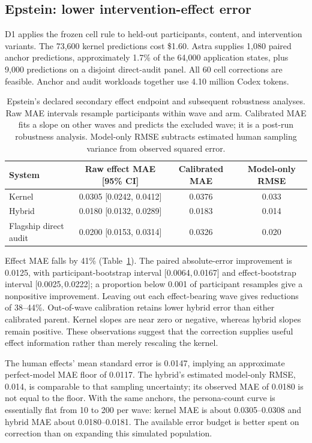 \documentclass[11pt]{article}
\newcommand{\CI}[2]{[#1,\,#2]}
\begin{document}
\subsection{Epstein: lower intervention-effect error}
D1 applies the frozen cell rule to held-out participants, content, and intervention variants. The 73,600 kernel predictions cost \$1.60. Astra supplies 1,080 paired anchor predictions, approximately 1.7\% of the 64,000 application states, plus 9,000 predictions on a disjoint direct-audit panel. All 60 cell corrections are feasible. Anchor and audit workloads together use 4.10 million Codex tokens.

\begin{table}[tp]
\centering\small
\caption{Epstein's declared secondary effect endpoint and subsequent robustness analyses. Raw MAE intervals resample participants within wave and arm. Calibrated MAE fits a slope on other waves and predicts the excluded wave; it is a post-run robustness analysis. Model-only RMSE subtracts estimated human sampling variance from observed squared error.}
\label{tab:epstein}
\begin{tabular}{lccc}
\toprule
System & Raw effect MAE [95\% CI] & Calibrated MAE & Model-only RMSE\\
\midrule
Kernel & 0.0305 [0.0242, 0.0412] & 0.0376 & 0.033\\
Hybrid & 0.0180 [0.0132, 0.0289] & 0.0183 & 0.014\\
Flagship direct audit & 0.0200 [0.0153, 0.0314] & 0.0326 & 0.020\\
\bottomrule
\end{tabular}
\end{table}

Effect MAE falls by 41\% (Table~\ref{tab:epstein}). The paired absolute-error improvement is 0.0125, with participant-bootstrap interval \CI{0.0064}{0.0167} and effect-bootstrap interval \CI{0.0025}{0.0222}; a proportion below 0.001 of participant resamples give a nonpositive improvement. Leaving out each effect-bearing wave gives reductions of 38--44\%. Out-of-wave calibration retains lower hybrid error than either calibrated parent. Kernel slopes are near zero or negative, whereas hybrid slopes remain positive. These observations suggest that the correction supplies useful effect information rather than merely rescaling the kernel.

The human effects' mean standard error is 0.0147, implying an approximate perfect-model MAE floor of 0.0117. The hybrid's estimated model-only RMSE, 0.014, is comparable to that sampling uncertainty; its observed MAE of 0.0180 is not equal to the floor. With the same anchors, the persona-count curve is essentially flat from 10 to 200 per wave: kernel MAE is about 0.0305--0.0308 and hybrid MAE about 0.0180--0.0181. The available error budget is better spent on correction than on expanding this simulated population.
\end{document}
